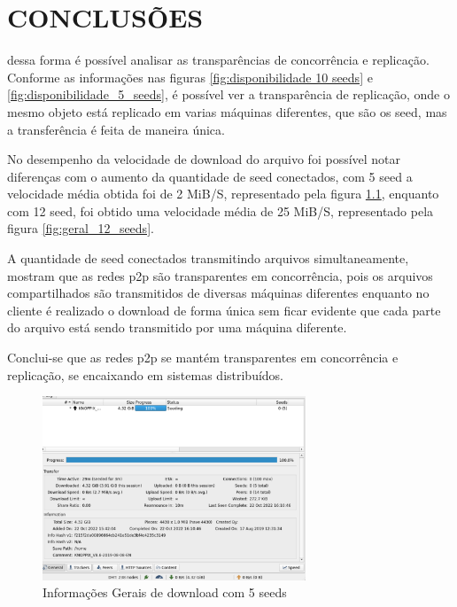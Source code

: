 \chapter{CONCLUSÕES}
\label{cap:05}
dessa forma é possível analisar as transparências de concorrência e replicação. 
Conforme as informações nas figuras \ref{fig:disponibilidade 10 seeds} e \ref{fig:disponibilidade_5_seeds}, é possível ver a transparência de replicação, onde o mesmo objeto está replicado em varias máquinas diferentes, que são os \ac{seed}, mas a transferência é feita de maneira única. 

No desempenho da velocidade de download do arquivo foi possível notar diferenças com o aumento da quantidade de \ac{seed} conectados, com 5 \ac{seed} a velocidade média obtida foi de 2 MiB/S, representado pela figura \ref{fig:geral_5_seeds}, enquanto com 12 \ac{seed}, foi obtido uma velocidade média de 25 MiB/S, representado pela figura \ref{fig:geral_12_seeds}.

A quantidade de \ac{seed} conectados transmitindo arquivos simultaneamente, mostram que as redes \ac{p2p} são transparentes em concorrência, pois os arquivos compartilhados são transmitidos de diversas máquinas diferentes enquanto no cliente é realizado o download de forma única sem ficar evidente que cada parte do arquivo está sendo transmitido por uma máquina diferente. 

Conclui-se que as redes \ac{p2p} se mantém transparentes em concorrência e replicação, se encaixando em sistemas distribuídos. 
\begin{figure}[!htb]
\centering
\includegraphics[width=0.7\textwidth]{./images/5 seeds geral.png}
\caption{Informações Gerais de download com 5 seeds}
\label{fig:geral_5_seeds}
\end{figure}

